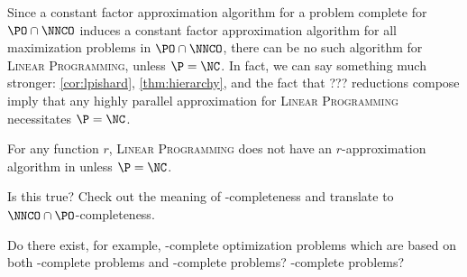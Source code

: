 \documentclass[]{article}
\newcommand{\APr}{\leq_{AP}^{L}}
\begin{document}
Since a constant factor \NC{} approximation algorithm for a problem complete for $\PO \cap \NNCO$ induces a constant factor \NC{} approximation algorithm for all maximization problems in $\PO \cap \NNCO$, there can be no such algorithm for \textsc{Linear Programming}, unless $\P = \NC$.
In fact, we can say something much stronger: \autoref{cor:lpishard}, \autoref{thm:hierarchy}, and the fact that ??? reductions compose imply that any highly parallel approximation for \textsc{Linear Programming} necessitates $\P = \NC$.

\begin{corollary}
  For any function $r$, \textsc{Linear Programming} does not have an $r$-approximation algorithm in \NC{} unless $\P = \NC$.
\end{corollary}

\begin{todo}
  Is this true? Check out the meaning of \NPO-completeness and translate to $\NNCO \cap \PO$-completeness.
\end{todo}



\begin{todo}
  Do there exist, for example, \ApxPO-complete optimization problems which are based on both \NP-complete problems and \PSPACE-complete problems?
  \STP-complete problems?
\end{todo}
\end{document}
